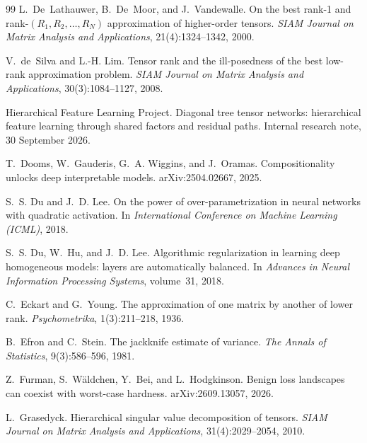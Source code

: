 \documentclass[11pt]{article}
\theoremstyle{definition}
\numberwithin{equation}{section}
\begin{document}
\begin{thebibliography}{99}
L.~De~Lathauwer, B.~De~Moor, and J.~Vandewalle.
\newblock On the best rank-1 and rank-$(R_1,R_2,\dots,R_N)$ approximation of higher-order tensors.
\newblock \emph{SIAM Journal on Matrix Analysis and Applications}, 21(4):1324--1342, 2000.

V.~de~Silva and L.-H. Lim.
\newblock Tensor rank and the ill-posedness of the best low-rank approximation problem.
\newblock \emph{SIAM Journal on Matrix Analysis and Applications}, 30(3):1084--1127, 2008.

Hierarchical Feature Learning Project.
\newblock Diagonal tree tensor networks: hierarchical feature learning through shared factors and residual paths.
\newblock Internal research note, 30 September 2026.

T.~Dooms, W.~Gauderis, G.~A. Wiggins, and J.~Oramas.
\newblock Compositionality unlocks deep interpretable models.
\newblock arXiv:2504.02667, 2025.

S.~S. Du and J.~D. Lee.
\newblock On the power of over-parametrization in neural networks with quadratic activation.
\newblock In \emph{International Conference on Machine Learning (ICML)}, 2018.

S.~S. Du, W.~Hu, and J.~D. Lee.
\newblock Algorithmic regularization in learning deep homogeneous models: layers are automatically balanced.
\newblock In \emph{Advances in Neural Information Processing Systems}, volume~31, 2018.

C.~Eckart and G.~Young.
\newblock The approximation of one matrix by another of lower rank.
\newblock \emph{Psychometrika}, 1(3):211--218, 1936.

B.~Efron and C.~Stein.
\newblock The jackknife estimate of variance.
\newblock \emph{The Annals of Statistics}, 9(3):586--596, 1981.

Z.~Furman, S.~W\"aldchen, Y.~Bei, and L.~Hodgkinson.
\newblock Benign loss landscapes can coexist with worst-case hardness.
\newblock arXiv:2609.13057, 2026.

L.~Grasedyck.
\newblock Hierarchical singular value decomposition of tensors.
\newblock \emph{SIAM Journal on Matrix Analysis and Applications}, 31(4):2029--2054, 2010.


\end{thebibliography}
\end{document}

